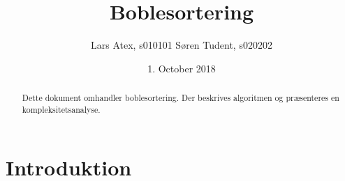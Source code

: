 \documentclass{article}
\title{Boblesortering}
\author{Lars Atex, s010101 \qquad Søren Tudent, s020202}
\date{1. October 2018}
\begin{document}
\maketitle

\begin{abstract}
Dette dokument omhandler boblesortering. Der beskrives algoritmen og præsenteres en kompleksitetsanalyse.
\end{abstract}
\section{Introduktion}
\end{document}

